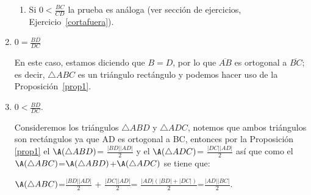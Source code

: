 \begin{pba}
\begin{enumerate}
\begin{enumerate}
		 

\item Si $0 <\frac{BC}{CD}$ la prueba es análoga (ver sección de ejercicios, Ejercicio~\ref{cortafuera}).		 

\end{enumerate}

\item $0= \frac{BD}{DC}$

En este caso, estamos diciendo que $B=D$, por lo que $\overline{AB}$ es ortogonal a $\overline{BC}$; es decir, $\triangle ABC$ es un triángulo rectángulo y podemos hacer uso de la Proposición~\ref{prop1}.

\item $0< \frac{BD}{DC}$.


Consideremos los triángulos $\triangle ABD$ y $\triangle ADC$, notemos que ambos triángulos son rectángulos ya que AD es ortogonal a BC, entonces por la Proposición \ref{prop1} el $\A(\triangle ABD)$= $\frac{|BD||AD|}{2}$ y el $\A(\triangle ADC)$= $\frac{|DC||AD|}{2}$ así que como	el $\A(\triangle ABC)$=$\A(\triangle ABD)$+$\A(\triangle ADC)$ se tiene que:
		 
$\A(\triangle ABC)$=$\frac{|BD||AD|}{2}$ +  $\frac{|DC||AD|}{2}$= $\frac{|AD|(|BD|+|DC|)}{2}$=$\frac{|AD||BC|}{2}.$
		

\end{enumerate}
\end{pba}
